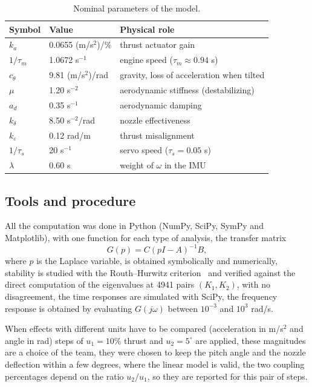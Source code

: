 \documentclass[article, 11pt]{IEEEtran}   %
\begin{document}
\begin{table}[!t]
\centering\small
\caption{Nominal parameters of the model.}\label{tab:param}
\begin{tabular}{p{0.9cm}p{2.4cm}p{3.6cm}}
\toprule
Symbol & Value & Physical role\\
\midrule
$k_a$ & 0.0655 (m/s$^2$)/\% & thrust actuator gain\\
$1/\tau_m$ & 1.0672 s$^{-1}$ & engine speed ($\tau_m\approx0.94$ s)\\
$c_\theta$ & 9.81 (m/s$^2$)/rad & gravity, loss of acceleration when tilted\\
$\mu$ & 1.20 s$^{-2}$ & aerodynamic stiffness (destabilizing)\\
$a_d$ & 0.35 s$^{-1}$ & aerodynamic damping\\
$k_\delta$ & 8.50 s$^{-2}$/rad & nozzle effectiveness\\
$k_\varepsilon$ & 0.12 rad/m & thrust misalignment\\
$1/\tau_s$ & 20 s$^{-1}$ & servo speed ($\tau_s=0.05$ s)\\
$\lambda$ & 0.60 s & weight of $\omega$ in the IMU\\
\bottomrule
\end{tabular}
\end{table}

\subsection{Tools and procedure}
All the computation was done in Python (NumPy, SciPy, SymPy and Matplotlib), with one function for each type of analysis, the transfer matrix
\begin{equation}
G(p)=C(pI-A)^{-1}B,
\end{equation}
where $p$ is the Laplace variable, is obtained symbolically and numerically, stability is studied with the Routh--Hurwitz criterion~\cite{ogata} and verified against the direct computation of the eigenvalues at 4941 pairs $(K_1,K_2)$, with no disagreement, the time responses are simulated with SciPy, the frequency response is obtained by evaluating $G(j\omega)$ between $10^{-3}$ and $10^{3}$ rad/s.

When effects with different units have to be compared (acceleration in m/s$^2$ and angle in rad) steps of $u_1=10\%$ thrust and $u_2=5^\circ$ are applied, these magnitudes are a choice of the team, they were chosen to keep the pitch angle and the nozzle deflection within a few degrees, where the linear model is valid, the two coupling percentages depend on the ratio $u_2/u_1$, so they are reported for this pair of steps.
\end{document}

